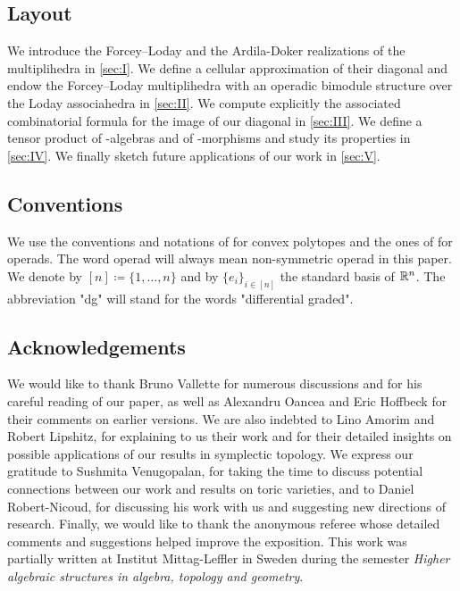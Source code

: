 \documentclass[10pt]{amsart}
\theoremstyle{remark}
\begin{document}
\subsection*{Layout} 
We introduce the Forcey--Loday and the Ardila-Doker realizations of the multiplihedra in \cref{sec:I}. 
We define a cellular approximation of their diagonal and endow the Forcey--Loday multiplihedra with an operadic bimodule structure over the Loday associahedra in \cref{sec:II}.
We compute explicitly the associated combinatorial formula for the image of our diagonal in \cref{sec:III}. 
We define a tensor product of \Ainf -algebras and of \Ainf -morphisms and study its properties in \cref{sec:IV}.
We finally sketch future applications of our work in \cref{sec:V}.

\subsection*{Conventions} 
We use the conventions and notations of \cite{Ziegler95} for convex polytopes and the ones of \cite{LodayVallette12} for operads. 
The word operad will always mean non-symmetric operad \cite[Section 5.2.8]{LodayVallette12} in this paper. 
We denote by $[n]\coloneqq \{1,\ldots,n\}$ and by $\{ e_i\}_{i \in [n]}$ the standard basis of $\mathbb{R}^n$.
The abbreviation "dg" will stand for the words "differential graded". 

\subsection*{Acknowledgements} 
We would like to thank Bruno Vallette for numerous discussions and for his careful reading of our paper, as well as Alexandru Oancea and Eric Hoffbeck for their comments on earlier versions.
We are also indebted to Lino Amorim and Robert Lipshitz, for explaining to us their work and for their detailed insights on possible applications of our results in symplectic topology. 
We express our gratitude to Sushmita Venugopalan, for taking the time to discuss potential connections between our work and results on toric varieties, and to Daniel Robert-Nicoud, for discussing his work with us and suggesting new directions of research. 
Finally, we would like to thank the anonymous referee whose detailed comments and suggestions helped improve the exposition.
This work was partially written at Institut Mittag-Leffler in Sweden during the semester \emph{Higher algebraic structures in algebra, topology and geometry}.

\end{document}
